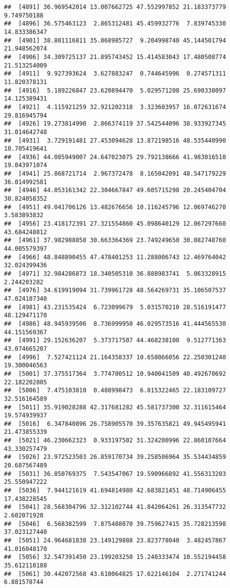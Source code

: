 \documentclass[
]{article}
\begin{document}
\begin{verbatim}
##  [4891] 36.969542014 13.007662725 47.552997852 21.183373779  9.749750188
##  [4896] 36.575463123  2.865312481 45.459932776  7.839745330 14.833386347
##  [4901] 38.801116811 35.068985727  9.204998740 45.144501794 21.948562074
##  [4906] 34.309725137 21.895743452 15.414583043 17.480508774 21.513254009
##  [4911]  9.927393624  3.627883247  0.744645996  0.274571311 11.820378131
##  [4916]  5.189226847 23.620894470  5.029571208 25.690338097 14.125389431
##  [4921]  4.115921259 32.921202318  3.323603957 16.072631674 29.816945794
##  [4926] 19.273814990  2.866374119 37.542544096 38.933927345 31.014642748
##  [4931]  3.729191481 27.453094628 13.872198516 48.535440990 10.705419641
##  [4936] 44.085949007 24.647023075 29.792138666 41.983016510 19.043971074
##  [4941] 25.868721714  2.967372478  8.165042091 48.547179229 36.014992581
##  [4946] 44.053161342 22.304667847 49.605715298 20.245404704 30.824058352
##  [4951] 49.041706126 13.482676656 10.116245796 12.069746270  3.583893832
##  [4956] 23.418172391 27.321554860 45.098640129 12.067297660 43.684248812
##  [4961] 37.982988858 30.663364369 23.749249650 30.082748760 44.005579397
##  [4966] 48.848890455 47.478401253 11.288006743 12.469764042 32.024399436
##  [4971] 32.984286873 18.340505310 36.888983741  5.063328915  2.244203282
##  [4976] 34.619919094 31.739961728 48.564269731 35.106507537 47.024107340
##  [4981] 43.231535424  6.723099679  5.031570210 28.516191477 48.129471170
##  [4986] 48.945939506  8.736999950 46.029573516 41.444565530 44.151569367
##  [4991] 29.152636207  5.373717507 44.468238100  9.512771363 43.074665207
##  [4996]  7.527421124 21.164358337 10.658066056 22.250301240 19.300046563
##  [5001] 37.375517364  3.774700512 10.940041509 40.492670692 22.182202805
##  [5006]  7.475103810  0.488998473  6.815322465 22.183109727 32.516164589
##  [5011] 35.919028288 42.317681282 45.581737300 32.311615464 19.574939937
##  [5016]  6.347840896 26.758905570 39.357635821 49.945495941 21.473855339
##  [5021] 46.230662323  0.933197502 31.324200996 22.860107664 43.330257479
##  [5026] 23.972523503 26.859170734 39.258506964 35.534434859 20.687567489
##  [5031] 36.850769375  7.543547067 19.590966892 41.556313203 25.550947222
##  [5036]  7.944121619 41.694814980 42.683821451 48.714906455 17.438228545
##  [5041] 28.568304796 32.312102744 41.842064261 26.313547732  2.602071920
##  [5046]  6.568382599  7.875488070 39.759627415 35.728213598 37.023127440
##  [5051] 24.964681838 23.149129888 23.823778040  3.482457867 41.016048170
##  [5056] 32.547391450 23.199203250 15.240333474 10.552194458 35.612110188
##  [5061] 30.442072568 43.610064825 17.622146104  2.271741244  6.881578744

\end{verbatim}
\end{document}
